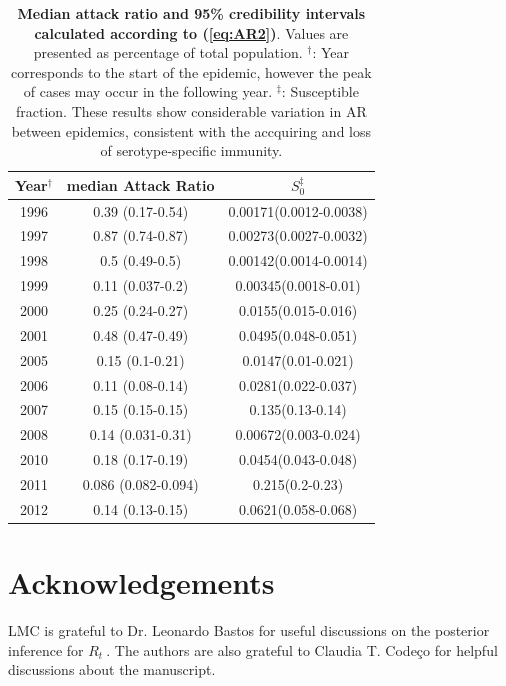 \documentclass[10pt]{article}
\def \rr {$R_{t}\:$}
\begin{document}
\begin{table}[!ht]
\caption{
{\bf Median attack ratio and 95\% credibility intervals calculated according to 
(\ref{eq:AR2})}. 
Values are presented as percentage of total population. 
$^\dag$: Year corresponds to the start of the epidemic, however the peak of cases
may occur in the following year.
$^\ddag$: Susceptible fraction.
These results show considerable variation in AR between epidemics, consistent with
the accquiring and loss of serotype-specific immunity.}
\begin{center}
\begin{tabular}{c|c|c}
\hline
Year$^\dag$ & median Attack Ratio & $S_0^\ddag$ \\
\hline
1996 & 0.39 (0.17-0.54) & 0.00171(0.0012-0.0038)\\
1997 & 0.87 (0.74-0.87) & 0.00273(0.0027-0.0032)\\
1998 & 0.5 (0.49-0.5) & 0.00142(0.0014-0.0014)\\
1999 & 0.11 (0.037-0.2) & 0.00345(0.0018-0.01)\\
2000 & 0.25 (0.24-0.27) & 0.0155(0.015-0.016)\\
2001 & 0.48 (0.47-0.49) & 0.0495(0.048-0.051)\\
2005 & 0.15 (0.1-0.21) & 0.0147(0.01-0.021)\\
2006 & 0.11 (0.08-0.14) & 0.0281(0.022-0.037)\\
2007 & 0.15 (0.15-0.15) & 0.135(0.13-0.14)\\
2008 & 0.14 (0.031-0.31) & 0.00672(0.003-0.024)\\
2010 & 0.18 (0.17-0.19) & 0.0454(0.043-0.048)\\
2011 & 0.086 (0.082-0.094) & 0.215(0.2-0.23)\\
2012 & 0.14 (0.13-0.15) & 0.0621(0.058-0.068)\\
\hline
\end{tabular}
\end{center}
\label{tab:AR}
\end{table}

\newpage
\section*{Acknowledgements}
LMC is grateful to Dr. Leonardo Bastos for useful discussions on the 
posterior inference for \rr.
The authors are also grateful to Claudia T. 
Code\c{c}o for helpful discussions about the manuscript.
\end{document}
